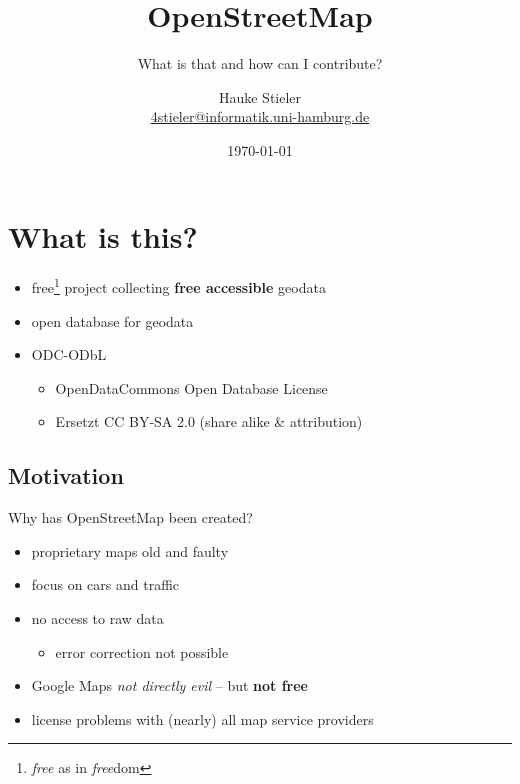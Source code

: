 \documentclass{beamer}
\author{Hauke Stieler\\\href{mailto:4stieler@informatik.uni-hamburg.de}{4stieler@informatik.uni-hamburg.de}}
\title{OpenStreetMap}
\subtitle{What is that and how can I contribute?}
\date{\today}
\begin{document}
	\maketitle
	
	\begin{frame}
		\tableofcontents
	\end{frame}

	\section{What is this?}
	
	\begin{frame}
		\begin{itemize}
			\item free\footnote{\textit{free} as in \textit{free}dom} project collecting \textbf{free accessible} geodata
			\item open database for geodata
			\item ODC-ODbL
			\begin{itemize}
				\item OpenDataCommons Open Database License
				\item Ersetzt CC BY-SA 2.0 {\tiny (share alike \& attribution)}
			\end{itemize}
		\end{itemize}
	\end{frame}

	\subsection{Motivation}
	
	\begin{frame}
		Why has OpenStreetMap been created?
		\begin{itemize}
			\item proprietary maps old and faulty
			\item focus on cars and traffic
			\item no access to raw data
			\begin{itemize}
				\item error correction not possible
			\end{itemize}
			\item Google Maps \textit{not directly evil} -- but \textbf{not free}
			\item license problems with (nearly) all map service providers
		\end{itemize}
	\end{frame}
\end{document}

